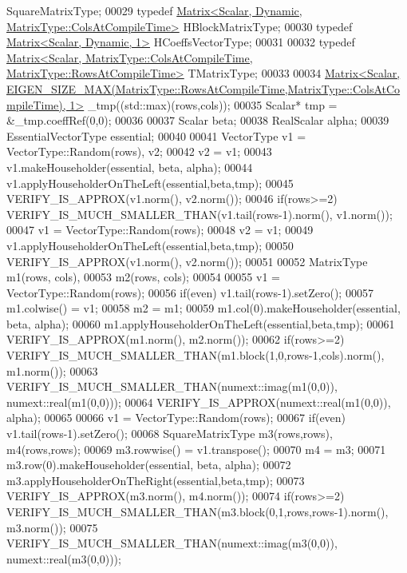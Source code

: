 \begin{DoxyCode}
       SquareMatrixType;
00029   \textcolor{keyword}{typedef} \hyperlink{group___core___module_class_eigen_1_1_matrix}{Matrix<Scalar, Dynamic, MatrixType::ColsAtCompileTime>}
       HBlockMatrixType;
00030   \textcolor{keyword}{typedef} \hyperlink{group___core___module}{Matrix<Scalar, Dynamic, 1>} HCoeffsVectorType;
00031 
00032   \textcolor{keyword}{typedef} 
      \hyperlink{group___core___module_class_eigen_1_1_matrix}{Matrix<Scalar, MatrixType::ColsAtCompileTime, MatrixType::RowsAtCompileTime>}
       TMatrixType;
00033   
00034   
      \hyperlink{group___core___module_class_eigen_1_1_matrix}{Matrix<Scalar, EIGEN\_SIZE\_MAX(MatrixType::RowsAtCompileTime,MatrixType::ColsAtCompileTime), 1>}
       \_tmp((std::max)(rows,cols));
00035   Scalar* tmp = &\_tmp.coeffRef(0,0);
00036 
00037   Scalar beta;
00038   RealScalar alpha;
00039   EssentialVectorType essential;
00040 
00041   VectorType v1 = VectorType::Random(rows), v2;
00042   v2 = v1;
00043   v1.makeHouseholder(essential, beta, alpha);
00044   v1.applyHouseholderOnTheLeft(essential,beta,tmp);
00045   VERIFY\_IS\_APPROX(v1.norm(), v2.norm());
00046   \textcolor{keywordflow}{if}(rows>=2) VERIFY\_IS\_MUCH\_SMALLER\_THAN(v1.tail(rows-1).norm(), v1.norm());
00047   v1 = VectorType::Random(rows);
00048   v2 = v1;
00049   v1.applyHouseholderOnTheLeft(essential,beta,tmp);
00050   VERIFY\_IS\_APPROX(v1.norm(), v2.norm());
00051 
00052   MatrixType m1(rows, cols),
00053              m2(rows, cols);
00054 
00055   v1 = VectorType::Random(rows);
00056   \textcolor{keywordflow}{if}(even) v1.tail(rows-1).setZero();
00057   m1.colwise() = v1;
00058   m2 = m1;
00059   m1.col(0).makeHouseholder(essential, beta, alpha);
00060   m1.applyHouseholderOnTheLeft(essential,beta,tmp);
00061   VERIFY\_IS\_APPROX(m1.norm(), m2.norm());
00062   \textcolor{keywordflow}{if}(rows>=2) VERIFY\_IS\_MUCH\_SMALLER\_THAN(m1.block(1,0,rows-1,cols).norm(), m1.norm());
00063   VERIFY\_IS\_MUCH\_SMALLER\_THAN(numext::imag(m1(0,0)), numext::real(m1(0,0)));
00064   VERIFY\_IS\_APPROX(numext::real(m1(0,0)), alpha);
00065 
00066   v1 = VectorType::Random(rows);
00067   \textcolor{keywordflow}{if}(even) v1.tail(rows-1).setZero();
00068   SquareMatrixType m3(rows,rows), m4(rows,rows);
00069   m3.rowwise() = v1.transpose();
00070   m4 = m3;
00071   m3.row(0).makeHouseholder(essential, beta, alpha);
00072   m3.applyHouseholderOnTheRight(essential,beta,tmp);
00073   VERIFY\_IS\_APPROX(m3.norm(), m4.norm());
00074   \textcolor{keywordflow}{if}(rows>=2) VERIFY\_IS\_MUCH\_SMALLER\_THAN(m3.block(0,1,rows,rows-1).norm(), m3.norm());
00075   VERIFY\_IS\_MUCH\_SMALLER\_THAN(numext::imag(m3(0,0)), numext::real(m3(0,0)));

\end{DoxyCode}
